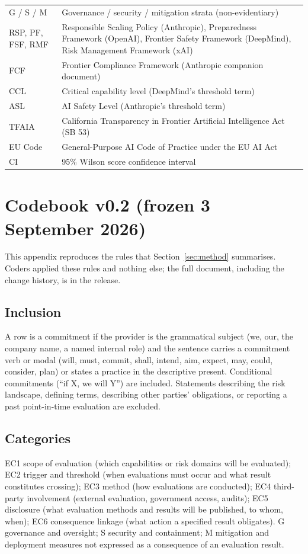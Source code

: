 \documentclass{article}
\begin{document}
\begin{table}[tbp]
\begin{tabular}{lp{9.4cm}}
G / S / M & Governance / security / mitigation strata (non-evidentiary) \\
RSP, PF, FSF, RMF & Responsible Scaling Policy (Anthropic), Preparedness Framework (OpenAI), Frontier Safety Framework (DeepMind), Risk Management Framework (xAI) \\
FCF & Frontier Compliance Framework (Anthropic companion document) \\
CCL & Critical capability level (DeepMind's threshold term) \\
ASL & AI Safety Level (Anthropic's threshold term) \\
TFAIA & California Transparency in Frontier Artificial Intelligence Act (SB 53) \\
EU Code & General-Purpose AI Code of Practice under the EU AI Act \\
CI & 95\% Wilson score confidence interval \\
\bottomrule
\end{tabular}
\end{table}

\section{Codebook v0.2 (frozen 3 September 2026)}
\label{apx:codebook}
This appendix reproduces the rules that Section~\ref{sec:method} summarises. Coders applied these rules and nothing else; the full document, including the change history, is in the release.
\subsection{Inclusion}
A row is a commitment if the provider is the grammatical subject (we, our, the company name, a named internal role) and the sentence carries a commitment verb or modal (will, must, commit, shall, intend, aim, expect, may, could, consider, plan) or states a practice in the descriptive present. Conditional commitments (``if X, we will Y'') are included. Statements describing the risk landscape, defining terms, describing other parties' obligations, or reporting a past point-in-time evaluation are excluded.
\subsection{Categories}
EC1 scope of evaluation (which capabilities or risk domains will be evaluated); EC2 trigger and threshold (when evaluations must occur and what result constitutes crossing); EC3 method (how evaluations are conducted); EC4 third-party involvement (external evaluation, government access, audits); EC5 disclosure (what evaluation methods and results will be published, to whom, when); EC6 consequence linkage (what action a specified result obligates). G governance and oversight; S security and containment; M mitigation and deployment measures not expressed as a consequence of an evaluation result.
\end{document}
